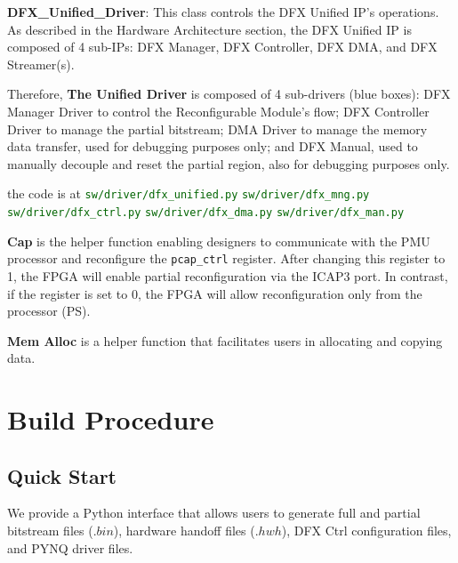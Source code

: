 \documentclass{cernatsnote}
\newcommand{\reg}[1]{\texttt{\textcolor{monocolor}{#1}}}
\begin{document}
\textbf{DFX\_Unified\_Driver}: This class controls the DFX Unified IP's operations. As described in the Hardware Architecture section, the DFX Unified IP is composed of 4 sub-IPs: DFX Manager, DFX Controller, DFX DMA, and DFX Streamer(s).

Therefore, \textbf{The Unified Driver} is composed of 4 sub-drivers (blue boxes): DFX Manager Driver to control the Reconfigurable Module's flow; DFX Controller Driver to manage the partial bitstream; DMA Driver to manage the memory data transfer, used for debugging purposes only; and DFX Manual, used to manually decouple and reset the partial region, also for debugging purposes only.

the code is at \newline
\textcolor{darkgreen}{\texttt{sw/driver/dfx\_unified.py}}\newline
\textcolor{darkgreen}{\texttt{sw/driver/dfx\_mng.py}}\newline
\textcolor{darkgreen}{\texttt{sw/driver/dfx\_ctrl.py}}\newline
\textcolor{darkgreen}{\texttt{sw/driver/dfx\_dma.py}}\newline
\textcolor{darkgreen}{\texttt{sw/driver/dfx\_man.py}}\newline


\textbf{Cap} is the helper function enabling designers to communicate with the PMU processor and reconfigure the \reg{pcap\_ctrl} register. After changing this register to 1, the FPGA will enable partial reconfiguration via the ICAP3 port. In contrast, if the register is set to 0, the FPGA will allow reconfiguration only from the processor (PS).

\textbf{Mem Alloc} is a helper function that facilitates users in allocating and copying data.


\pagebreak
\section{Build Procedure}


\subsection{Quick Start}

We provide a Python interface that allows users to generate full and partial bitstream files ($.bin$), hardware handoff files ($.hwh$), DFX Ctrl configuration files, and PYNQ driver files. 
\end{document}
